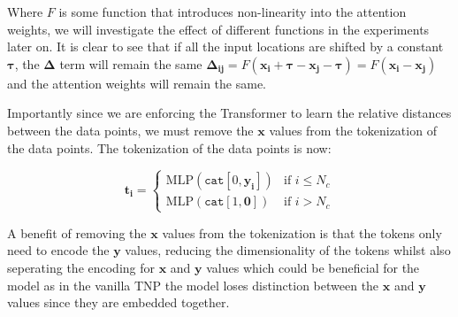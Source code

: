 \documentclass[../../main.tex]{subfiles}
\begin{document}
Where $F$ is some function that introduces non-linearity into the attention weights, we will investigate the effect of different functions in the experiments later on. It is clear to see that if all the input locations are shifted by a constant $\bm{\tau}$, the $\bm{\Delta}$ term will remain the same $\bm{\Delta_{ij}} = F(\bm{x_i} + \bm{\tau} - \bm{x_j} - \bm{\tau}) = F(\bm{x_i} - \bm{x_j})$ and the attention weights will remain the same.

Importantly since we are enforcing the Transformer to learn the relative distances between the data points, we must remove the $\bm{x}$ values from the tokenization of the data points. The tokenization of the data points is now:

\[
	\bm{t_i} = \begin{cases}
		\text{MLP}(\texttt{cat}[0, \bm{y_i}]) & \text{if } i \leq N_c \\
		\text{MLP}(\texttt{cat}[1, \bm{ 0}]) & \text{if } i > N_c
	\end{cases}
\]




A benefit of removing the $\bm{x}$ values from the tokenization is that the tokens only need to encode the $\bm{y}$ values, reducing the dimensionality of the tokens whilst also seperating the encoding for $\bm{x}$ and $\bm{y}$ values which could be beneficial for the model as in the vanilla TNP the model loses distinction between the $\bm{x}$ and $\bm{y}$ values since they are embedded together.









\end{document}
